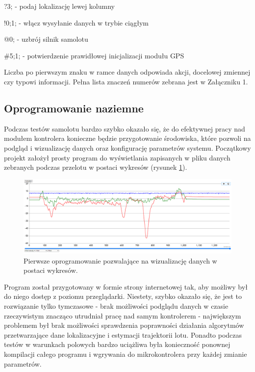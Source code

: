 \documentclass[12pt, a4paper]{article}
\begin{document}
?3; - podaj lokalizację lewej kolumny

!0;1; - włącz wysyłanie danych w trybie ciągłym

@0; - uzbrój silnik samolotu

\#5;1; - potwierdzenie prawidłowej inicjalizacji modułu GPS

Liczba po pierwszym znaku w ramce danych odpowiada akcji, docelowej zmiennej czy typowi informacji. Pełna lista znaczeń numerów zebrana jest w Załączniku 1.

\FloatBarrier
\subsection{Oprogramowanie naziemne}
Podczas testów samolotu bardzo szybko okazało się, że do efektywnej pracy nad modułem kontrolera konieczne będzie przygotowanie środowiska, które pozwoli na podgląd i wizualizację danych oraz konfigurację parametrów systemu. Początkowy projekt założył prosty program do wyświetlania zapisanych w pliku danych zebranych podczas przelotu w postaci wykresów (rysunek \ref{fig:staryprogram}).

 \begin{figure}[ht]
    \centering
    \includegraphics[width=1\textwidth]{starysystem}
    \caption{Pierwsze oprogramowanie pozwalające na wizualizację danych w postaci wykresów.}
    \label{fig:staryprogram}
\end{figure}

Program został przygotowany w formie strony internetowej tak, aby możliwy był do niego dostęp z poziomu przeglądarki. Niestety, szybko okazało się, że jest to rozwiązanie tylko tymczasowe - brak możliwości podglądu danych w czasie rzeczywistym znacząco utrudniał pracę nad samym kontrolerem - największym problemem był brak możliwości sprawdzenia poprawności działania algorytmów przetwarzające dane lokalizacyjne i estymacji trajektorii lotu. Ponadto podczas testów w warunkach polowych bardzo uciążliwa była konieczność ponownej kompilacji całego programu i wgrywania do mikrokontrolera przy każdej zmianie parametrów. 
\end{document}
